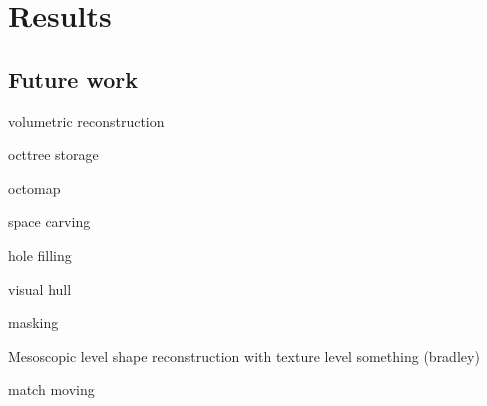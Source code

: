 \section{Results}

\subsection{Future work}

volumetric reconstruction

octtree storage

octomap

space carving

hole filling

visual hull

masking

Mesoscopic level shape reconstruction with texture level something (bradley)

match moving
